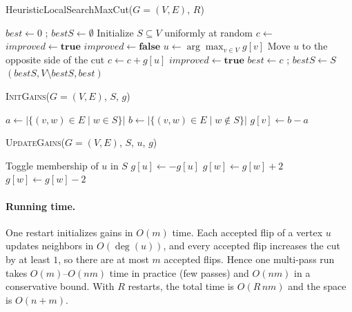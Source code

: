 \documentclass[12pt]{article}
\begin{document}
\begin{algorithm}[H]
\caption{HeuristicLocalSearchMaxCut($G=(V,E)$, $R$)}
\begin{algorithmic}[1]
\State $best \gets 0$ ; $bestS \gets \emptyset$
 
    \State Initialize $S \subseteq V$ uniformly at random
    \State {}
    \State $c \gets$ 
    \State $improved \gets \textbf{true}$
        \State $improved \gets \textbf{false}$
        \State $u \gets \arg\max_{v \in V} g[v]$
            \State Move $u$ to the opposite side of the cut
            \State $c \gets c + g[u]$
            \State {}
            \State $improved \gets \textbf{true}$
        \EndIf
    \EndWhile
     \State $best \gets c$ ; $bestS \gets S$ \EndIf
\EndFor
\State \Return $(bestS, V \setminus bestS, best)$
\end{algorithmic}
\end{algorithm}

\begin{algorithm}[H]
\caption{\textsc{InitGains}($G=(V,E)$, $S$, $g$)}
\begin{algorithmic}[1]
    \State $a \gets |\{(v,w)\in E \mid w \in S\}|$
    \State $b \gets |\{(v,w)\in E \mid w \notin S\}|$
    \State $g[v] \gets b - a$ 
\EndFor
\end{algorithmic}
\end{algorithm}

\begin{algorithm}[H]
\caption{\textsc{UpdateGains}($G=(V,E)$, $S$, $u$, $g$)}
\begin{algorithmic}[1]
\State Toggle membership of $u$ in $S$
\State $g[u] \gets -g[u]$
     \State $g[w] \gets g[w] + 2$
    \Else \State $g[w] \gets g[w] - 2$
    \EndIf
\EndFor
\end{algorithmic}
\end{algorithm}

\paragraph{Running time.}
One restart initializes gains in $O(m)$ time. Each accepted flip of a vertex $u$
updates neighbors in $O(\deg(u))$, and every accepted flip increases the cut by at
least $1$, so there are at most $m$ accepted flips. Hence one multi-pass run takes
$O(m)$–$O(nm)$ time in practice (few passes) and $O(nm)$ in a conservative bound.
With $R$ restarts, the total time is $O(R\,nm)$ and the space is $O(n+m)$.
\end{document}
